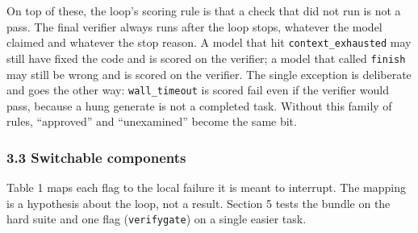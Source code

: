 \documentclass[
  10pt,
  a4paper,
]{article}
\let\oldtexttt\texttt
\renewcommand{\texttt}[1]{{\small\oldtexttt{#1}}}
\begin{document}
On top of these, the loop's scoring rule is that a check that did not
run is not a pass. The final verifier always runs after the loop stops,
whatever the model claimed and whatever the stop reason. A model that
hit \texttt{context\_exhausted} may still have fixed the code and is
scored on the verifier; a model that called \texttt{finish} may still be
wrong and is scored on the verifier. The single exception is deliberate
and goes the other way: \texttt{wall\_timeout} is scored fail even if
the verifier would pass, because a hung generate is not a completed
task. Without this family of rules, ``approved'' and ``unexamined''
become the same bit.

\subsubsection{3.3 Switchable components}\label{switchable-components}

Table 1 maps each flag to the local failure it is meant to interrupt.
The mapping is a hypothesis about the loop, not a result. Section 5
tests the bundle on the hard suite and one flag (\texttt{verifygate}) on
a single easier task.
\end{document}
